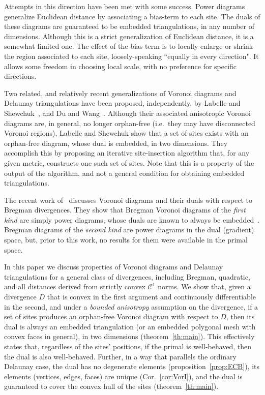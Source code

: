 \documentclass[11pt]{article}
\begin{document}
Attempts in this direction have been met with some success. 
Power diagrams~\cite{power} generalize Euclidean distance by associating 
a {bias-term}
to each 
site. The duals of these diagrams
are  
guaranteed to be embedded triangulations, in any number of
dimensions. 
Although this is a strict generalization of Euclidean distance, it is a somewhat 
limited one. The effect of the bias term is to locally enlarge or shrink the
region associated to each site, loosely-speaking ``equally in every
direction". It allows some freedom in choosing local scale, with no
preference for specific directions. 





Two related, and relatively recent generalizations of Voronoi diagrams and Delaunay triangulations have been proposed, 
independently, by Labelle and Shewchuk~\cite{LS}, and Du and Wang~\cite{DW}. 
Although their associated anisotropic Voronoi diagrams are, in general, no longer orphan-free
(i.e.~they may have disconnected Voronoi regions), 
Labelle and Shewchuk show that a set of sites exists 
with an orphan-free diagram, whose dual is embedded, in two dimensions. 
They accomplish this by proposing an iterative site-insertion algorithm
that, for any given metric, constructs one such set of sites. 
Note that this is a property of the output of the algorithm, and not a general condition for obtaining embedded triangulations. 


The recent work of~\cite{Bregman} discusses Voronoi diagrams and their duals with respect to Bregman divergences. 
They show that Bregman Voronoi diagrams of the \emph{first kind} are simply power diagrams, 
	whose duals are known to always be embedded~\cite{powerdiag}. 
Bregman diagrams of the \emph{second kind} are power diagrams in the dual (gradient) space, 
	but, prior to this work, no results for them were available in the primal space. 


In this paper we discuss properties of Voronoi diagrams and Delaunay triangulations for 
	a general class of divergences, 
	including Bregman, quadratic, and all distances derived from strictly convex $\mathcal{C}^1$ norms. 
We show that, 
given a divergence $D$ that is convex in the first argument and continuously differentiable in the second, 
	and under a \emph{bounded anisotropy} assumption on the divergence, 
 if a set of sites produces an orphan-free 
Voronoi diagram with respect to $D$,
then its dual is always an embedded triangulation 
	(or an embedded polygonal mesh with convex faces in general), 
in two dimensions (theorem~\ref{th:main}). 
This effectively states that, regardless of the sites' positions, if the primal 
is well-behaved, then the dual is also well-behaved. 
Further, in a way that parallels the ordinary Delaunay case, the dual has no
degenerate elements (proposition~\ref{prop:ECB}), its elements (vertices, edges, faces) 
are unique (Cor.~\ref{cor:VorI}), and the dual is guaranteed to cover the convex hull of the sites (theorem~\ref{th:main}). 
\end{document}

